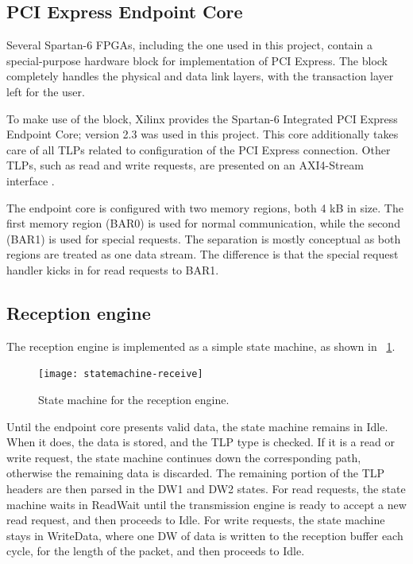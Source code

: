 \subsection{PCI Express Endpoint Core}

Several Spartan-6 FPGAs, including the one used in this project, contain a special-purpose hardware block for implementation of PCI Express.
The block completely handles the physical and data link layers, with the transaction layer left for the user.

To make use of the block, Xilinx provides the Spartan-6 Integrated PCI Express Endpoint Core; version 2.3 was used in this project.
This core additionally takes care of all TLPs related to configuration of the PCI Express connection.
Other TLPs, such as read and write requests, are presented on an AXI4-Stream interface \cite{ug672}.

The endpoint core is configured with two memory regions, both 4 kB in size\footnotemark.
The first memory region (BAR0) is used for normal communication, while the second (BAR1) is used for special requests.
The separation is mostly conceptual as both regions are treated as one data stream.
The difference is that the special request handler kicks in for read requests to BAR1.

\subsection{Reception engine}

The reception engine is implemented as a simple state machine, as shown in \figurename~\ref{fig:statemachine-receive}.

\begin{figure}[!ht]
    \centering
    \texttt{[image: statemachine-receive]}
    \caption[Reception engine state machine]{
        State machine for the reception engine.
    }
    \label{fig:statemachine-receive}
\end{figure}

Until the endpoint core presents valid data, the state machine remains in Idle.
When it does, the data is stored, and the TLP type is checked.
If it is a read or write request, the state machine continues down the corresponding path, otherwise the remaining data is discarded.
The remaining portion of the TLP headers are then parsed in the DW1 and DW2 states.
For read requests, the state machine waits in ReadWait until the transmission engine is ready to accept a new read request, and then proceeds to Idle.
For write requests, the state machine stays in WriteData, where one DW of data is written to the reception buffer each cycle, for the length of the packet, and then proceeds to Idle.

